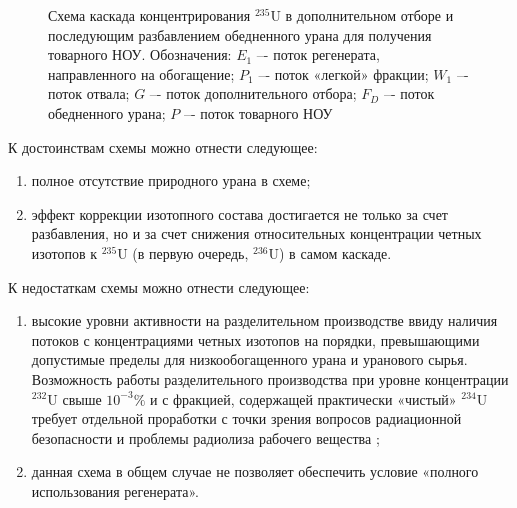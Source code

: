 \begin{figure}[ht]
  \caption{Схема каскада концентрирования $^{235}$U в дополнительном отборе и последующим разбавлением обедненного урана для получения товарного НОУ. Обозначения: $E_1$ –- поток регенерата, направленного на обогащение; $P_1$ –- поток «легкой» фракции; $W_1$ –- поток отвала; $G$ –- поток дополнительного отбора; $F_D$ –- поток обедненного урана; $P$ –- поток товарного НОУ
  }\label{fig:enl}
\end{figure}

К достоинствам схемы можно отнести следующее:

\begin{enumerate}
  \item полное отсутствие природного урана в схеме;
  \item эффект коррекции изотопного состава достигается не только за счет разбавления, но и за счет снижения относительных концентрации четных изотопов к $^{235}$U (в первую очередь, $^{236}$U) в самом каскаде.
\end{enumerate}

К недостаткам схемы можно отнести следующее:
\begin{enumerate}
  \item высокие уровни активности на разделительном производстве ввиду наличия потоков с концентрациями четных изотопов на порядки, превышающими допустимые пределы для низкообогащенного урана и уранового сырья. Возможность работы разделительного производства при уровне концентрации $^{232}$U свыше $10^{-3} \%$ и с фракцией, содержащей практически «чистый» $^{234}$U требует отдельной проработки с точки зрения вопросов радиационной безопасности и проблемы радиолиза рабочего вещества \cite{belovRADIOLIZOBOGAShchENNOGO2322019}; 
  \item данная схема в общем случае не позволяет обеспечить условие «полного использования регенерата».
\end{enumerate}


